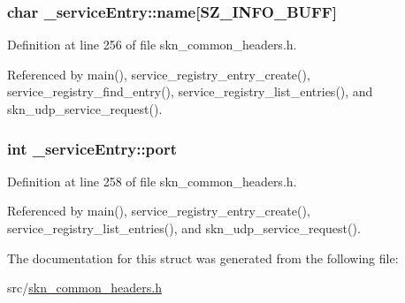 \subsubsection[{\texorpdfstring{name}{name}}]{\setlength{\rightskip}{0pt plus 5cm}char \+\_\+service\+Entry\+::name\mbox{[}{\bf S\+Z\+\_\+\+I\+N\+F\+O\+\_\+\+B\+U\+FF}\mbox{]}}\hypertarget{struct__service_entry_aa66dcf0806f67276d049ac75c6153768}{}\label{struct__service_entry_aa66dcf0806f67276d049ac75c6153768}


Definition at line 256 of file skn\+\_\+common\+\_\+headers.\+h.



Referenced by main(), service\+\_\+registry\+\_\+entry\+\_\+create(), service\+\_\+registry\+\_\+find\+\_\+entry(), service\+\_\+registry\+\_\+list\+\_\+entries(), and skn\+\_\+udp\+\_\+service\+\_\+request().

\subsubsection[{\texorpdfstring{port}{port}}]{\setlength{\rightskip}{0pt plus 5cm}int \+\_\+service\+Entry\+::port}\hypertarget{struct__service_entry_ac8a3a40de5eee937afb42faea4d18bb2}{}\label{struct__service_entry_ac8a3a40de5eee937afb42faea4d18bb2}


Definition at line 258 of file skn\+\_\+common\+\_\+headers.\+h.



Referenced by main(), service\+\_\+registry\+\_\+entry\+\_\+create(), service\+\_\+registry\+\_\+list\+\_\+entries(), and skn\+\_\+udp\+\_\+service\+\_\+request().



The documentation for this struct was generated from the following file\+:\begin{DoxyCompactItemize}
\item 
src/\hyperlink{skn__common__headers_8h}{skn\+\_\+common\+\_\+headers.\+h}\end{DoxyCompactItemize}
